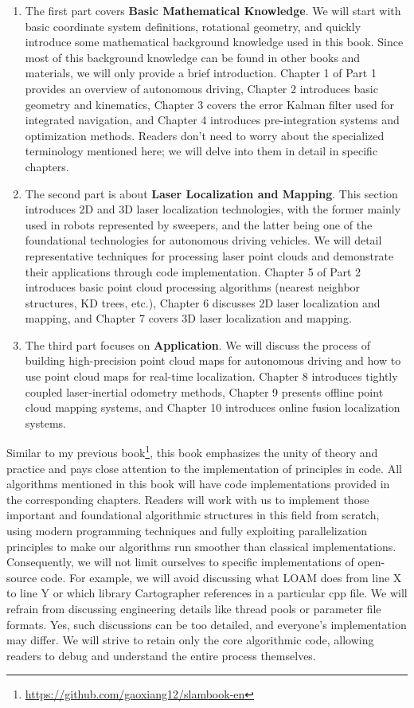 \begin{enumerate}
	\item The first part covers \textbf{Basic Mathematical Knowledge}. We will start with basic coordinate system definitions, rotational geometry, and quickly introduce some mathematical background knowledge used in this book. Since most of this background knowledge can be found in other books and materials, we will only provide a brief introduction. Chapter 1 of Part 1 provides an overview of autonomous driving, Chapter 2 introduces basic geometry and kinematics, Chapter 3 covers the error Kalman filter used for integrated navigation, and Chapter 4 introduces pre-integration systems and optimization methods. Readers don't need to worry about the specialized terminology mentioned here; we will delve into them in detail in specific chapters.
	\item The second part is about \textbf{Laser Localization and Mapping}. This section introduces 2D and 3D laser localization technologies, with the former mainly used in robots represented by sweepers, and the latter being one of the foundational technologies for autonomous driving vehicles. We will detail representative techniques for processing laser point clouds and demonstrate their applications through code implementation. Chapter 5 of Part 2 introduces basic point cloud processing algorithms (nearest neighbor structures, KD trees, etc.), Chapter 6 discusses 2D laser localization and mapping, and Chapter 7 covers 3D laser localization and mapping.
	\item The third part focuses on \textbf{Application}. We will discuss the process of building high-precision point cloud maps for autonomous driving and how to use point cloud maps for real-time localization. Chapter 8 introduces tightly coupled laser-inertial odometry methods, Chapter 9 presents offline point cloud mapping systems, and Chapter 10 introduces online fusion localization systems.
\end{enumerate}

Similar to my previous book\footnote{\url{https://github.com/gaoxiang12/slambook-en}}, this book emphasizes the unity of theory and practice and pays close attention to the implementation of principles in code. All algorithms mentioned in this book will have code implementations provided in the corresponding chapters. Readers will work with us to implement those important and foundational algorithmic structures in this field from scratch, using modern programming techniques and fully exploiting parallelization principles to make our algorithms run smoother than classical implementations. Consequently, we will not limit ourselves to specific implementations of open-source code. For example, we will avoid discussing what LOAM does from line X to line Y or which library Cartographer references in a particular cpp file. We will refrain from discussing engineering details like thread pools or parameter file formats. Yes, such discussions can be too detailed, and everyone's implementation may differ. We will strive to retain only the core algorithmic code, allowing readers to debug and understand the entire process themselves.

